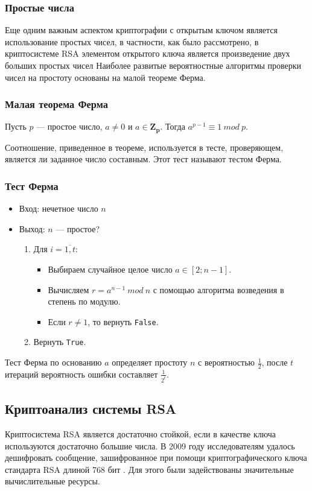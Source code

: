 \subsubsection*{Простые числа}
Еще одним важным аспектом криптографии с открытым ключом является использование простых чисел, в частности, как было рассмотрено, в криптосистеме RSA элементом открытого ключа является произведение двух больших простых чисел 
Наиболее развитые вероятностные алгоритмы проверки чисел на простоту основаны на малой теореме Ферма.

\subsubsection*{Малая теорема Ферма}
Пусть $p$ — простое число, $a \neq 0$ и $a \in \mathbf{Z_p}$. Тогда $a^{p-1} \equiv 1 \ mod \ p$.

Соотношение, приведенное в теореме, используется в тесте, проверяющем, является ли заданное число составным. Этот тест называют тестом Ферма.

\subsubsection*{Тест Ферма}
\begin{itemize}
    \item Вход: нечетное число $n$
    \item Выход: $n$ — простое?
    \begin{enumerate}
        \item Для $i = \overline{1, t}$:
        \begin{itemize}
            \item Выбираем случайное целое число $a \in [2; n-1]$.
            \item Вычисляем $r = a^{n-1} \ mod \ n$ с помощью алгоритма возведения в степень по модулю.
            \item Если $r \neq 1$, то вернуть \verb|False|.
        \end{itemize}
        \item Вернуть \verb|True|.
    \end{enumerate}
\end{itemize}
Тест Ферма по основанию $a$ определяет простоту $n$ с вероятностью $\frac{1}{2}$, после $t$ итераций вероятность ошибки составляет $\frac{1}{2^t}$.




\subsection{Криптоанализ системы RSA}
Криптосистема RSA является достаточно стойкой, если в качестве ключа используются достаточно большие числа. В 2009 году исследователям удалось дешифровать сообщение, зашифрованное при помощи криптографического ключа стандарта RSA длиной 768 бит \cite{rsa:768}. Для этого были задействованы значительные вычислительные ресурсы.

